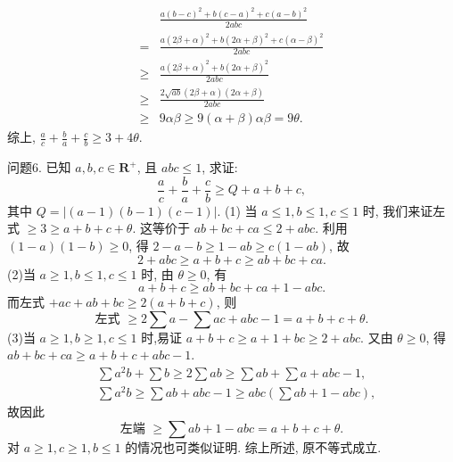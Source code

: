 $$
\begin{aligned}
& \frac{a(b-c)^2+b(c-a)^2+c(a-b)^2}{2 a b c} \\
= & \frac{a(2 \beta+\alpha)^2+b(2 \alpha+\beta)^2+c(\alpha-\beta)^2}{2 a b c} \\
\geqslant & \frac{a(2 \beta+\alpha)^2+b(2 \alpha+\beta)^2}{2 a b c} \\
\geqslant & \frac{2 \sqrt{a b}(2 \beta+\alpha)(2 \alpha+\beta)}{2 a b c} \\
\geqslant & 9 \alpha \beta \geqslant 9(\alpha+\beta) \alpha \beta=9 \theta .
\end{aligned}
$$
综上, $\frac{a}{c}+\frac{b}{a}+\frac{c}{b} \geqslant 3+4 \theta$.



问题6. 已知 $a, b, c \in \mathbf{R}^{+}$, 且 $a b c \leqslant 1$, 求证:
$$
\frac{a}{c}+\frac{b}{a}+\frac{c}{b} \geqslant Q+a+b+c,
$$
其中 $Q=|(a-1)(b-1)(c-1)|$.
(1) 当 $a \leqslant 1, b \leqslant 1, c \leqslant 1$ 时, 我们来证左式 $\geqslant 3 \geqslant a+b+c+\theta$. 这等价于 $a b+b c+c a \leqslant 2+a b c$.
利用 $(1-a)(1-b) \geqslant 0$, 得 $2-a-b \geqslant 1-a b \geqslant c(1-a b)$, 故
$$
2+a b c \geqslant a+b+c \geqslant a b+b c+c a .
$$
(2)当 $a \geqslant 1, b \leqslant 1, c \leqslant 1$ 时, 由 $\theta \geqslant 0$, 有
$$
a+b+c \geqslant a b+b c+c a+1-a b c .
$$
而左式 $+a c+a b+b c \geqslant 2(a+b+c)$, 则
$$
\text { 左式 } \geqslant 2 \sum a-\sum a c+a b c-1=a+b+c+\theta \text {. }
$$
(3)当 $a \geqslant 1, b \geqslant 1, c \leqslant 1$ 时,易证 $a+b+c \geqslant a+1+b c \geqslant 2+a b c$.
又由 $\theta \geqslant 0$, 得 $a b+b c+c a \geqslant a+b+c+a b c-1$.
$$
\begin{aligned}
& \sum a^2 b+\sum b \geqslant 2 \sum a b \geqslant \sum a b+\sum a+a b c-1, \\
& \sum a^2 b \geqslant \sum a b+a b c-1 \geqslant a b c\left(\sum a b+1-a b c\right),
\end{aligned}
$$
故因此
$$
\text { 左端 } \geqslant \sum a b+1-a b c=a+b+c+\theta \text {. }
$$
对 $a \geqslant 1, c \geqslant 1, b \leqslant 1$ 的情况也可类似证明.
综上所述, 原不等式成立.



